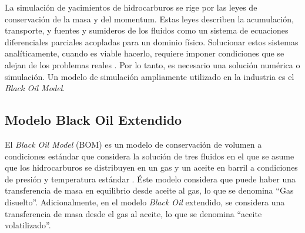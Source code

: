 La simulación de yacimientos de hidrocarburos se rige por las leyes de conservación de la masa y del momentum. Estas leyes describen la acumulación, transporte, y fuentes y sumideros de los fluidos como un sistema de ecuaciones diferenciales parciales acopladas para un dominio físico. Solucionar estos sistemas analíticamente, cuando es viable hacerlo, requiere imponer condiciones que se alejan de los problemas reales \citep{ertekin2001basic}. Por lo tanto, es necesario una solución numérica o simulación. Un modelo de simulación ampliamente utilizado en la industria es el \textit{Black Oil Model}.%


\subsection{Modelo Black Oil Extendido}

El \textit{Black Oil Model} (BOM) es un modelo de conservación de volumen a condiciones estándar que considera la solución de tres fluidos en el que se asume que los hidrocarburos se distribuyen en un gas y un aceite en barril a condiciones de presión y temperatura estándar \citep{jamal2006petroleum, chen2007reservoir, ertekin2001basic}. Éste modelo considera que puede haber una transferencia de masa en equilibrio desde aceite al gas, lo que se denomina ``Gas disuelto''. Adicionalmente, en el modelo \textit{Black Oil} extendido, se considera una transferencia de masa desde el gas al aceite, lo que se denomina ``aceite volatilizado''.

